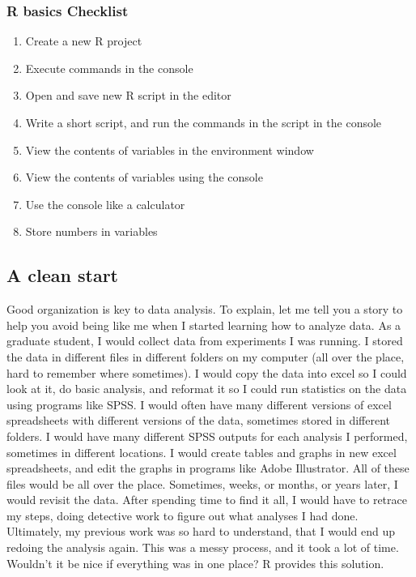 \documentclass[]{book}
\providecommand{\tightlist}{%
  \setlength{\itemsep}{0pt}\setlength{\parskip}{0pt}}
\theoremstyle{definition}
\theoremstyle{definition}
\theoremstyle{definition}
\theoremstyle{remark}
\begin{document}
\subsubsection{R basics Checklist}\label{r-basics-checklist}

\begin{enumerate}
\def\labelenumi{\arabic{enumi}.}
\tightlist
\item
  Create a new R project
\item
  Execute commands in the console
\item
  Open and save new R script in the editor
\item
  Write a short script, and run the commands in the script in the
  console
\item
  View the contents of variables in the environment window
\item
  View the contents of variables using the console
\item
  Use the console like a calculator
\item
  Store numbers in variables
\end{enumerate}

\subsection{A clean start}\label{a-clean-start}

Good organization is key to data analysis. To explain, let me tell you a
story to help you avoid being like me when I started learning how to
analyze data. As a graduate student, I would collect data from
experiments I was running. I stored the data in different files in
different folders on my computer (all over the place, hard to remember
where sometimes). I would copy the data into excel so I could look at
it, do basic analysis, and reformat it so I could run statistics on the
data using programs like SPSS. I would often have many different
versions of excel spreadsheets with different versions of the data,
sometimes stored in different folders. I would have many different SPSS
outputs for each analysis I performed, sometimes in different locations.
I would create tables and graphs in new excel spreadsheets, and edit the
graphs in programs like Adobe Illustrator. All of these files would be
all over the place. Sometimes, weeks, or months, or years later, I would
revisit the data. After spending time to find it all, I would have to
retrace my steps, doing detective work to figure out what analyses I had
done. Ultimately, my previous work was so hard to understand, that I
would end up redoing the analysis again. This was a messy process, and
it took a lot of time. Wouldn't it be nice if everything was in one
place? R provides this solution.
\end{document}

